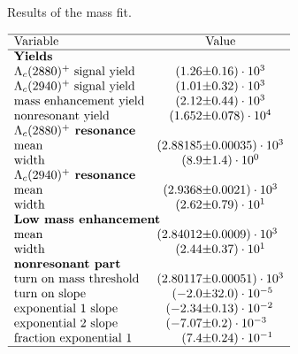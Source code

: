  
\begin{table}[h]
    \centering
    \caption{Results of the \Dz\proton mass fit.}
    \label{tab:fit_mD0p_RS}
    $\begin{array}{lr@{\pm}l}
    \hline
    \text{Variable} & \multicolumn{2}{c}{\text{Value}} \\
    \hline
        \multicolumn{3}{l}{\text{\textbf{Yields}}} \\
\text{\LcResI signal yield}&(1.26 & 0.16) \cdot 10^{3}\\
\text{\LcResII signal yield}&(1.01 & 0.32) \cdot 10^{3}\\
\text{mass enhancement yield}&(2.12 & 0.44) \cdot 10^{3}\\
\text{nonresonant yield}&(1.652 & 0.078) \cdot 10^{4}\\
\multicolumn{3}{l}{\text{\textbf{\LcResI resonance}}} \\
\text{mean}&(2.88185 & 0.00035) \cdot 10^{3}\\
\text{width}&(8.9 & 1.4) \cdot 10^{0}\\
\multicolumn{3}{l}{\text{\textbf{\LcResII resonance}}} \\
\text{mean}&(2.9368 & 0.0021) \cdot 10^{3}\\
\text{width}&(2.62 & 0.79) \cdot 10^{1}\\
\multicolumn{3}{l}{\text{\textbf{Low mass enhancement}}} \\
\text{mean}&(2.84012 & 0.0009) \cdot 10^{3}\\
\text{width}&(2.44 & 0.37) \cdot 10^{1}\\
\multicolumn{3}{l}{\text{\textbf{nonresonant part}}} \\
\text{turn on mass threshold}&(2.80117 & 0.00051) \cdot 10^{3}\\
\text{turn on slope}&(-2.0 & 32.0) \cdot 10^{-5}\\
\text{exponential 1 slope}&(-2.34 & 0.13) \cdot 10^{-2}\\
\text{exponential 2 slope}&(-7.07 & 0.2) \cdot 10^{-3}\\
\text{fraction exponential 1}&(7.4 & 0.24) \cdot 10^{-1}\\

\hline
\end{array}$
\end{table}
    